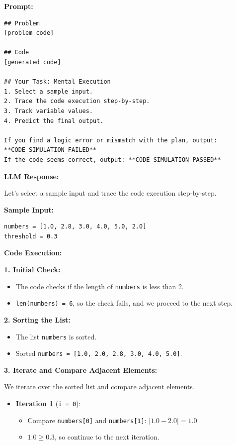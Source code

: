 \documentclass[11pt]{article}
\begin{document}
\begin{tcolorbox}[breakable, colback=white, colframe=black!70, boxrule=0.5pt, arc=2pt, left=4mm, right=4mm, top=3mm, bottom=3mm]
\textbf{Prompt:}
\begin{verbatim}
## Problem
[problem code]

## Code
[generated code]

## Your Task: Mental Execution
1. Select a sample input.
2. Trace the code execution step-by-step.
3. Track variable values.
4. Predict the final output.

If you find a logic error or mismatch with the plan, output: **CODE_SIMULATION_FAILED**
If the code seems correct, output: **CODE_SIMULATION_PASSED**
\end{verbatim}

\textbf{LLM Response:}

Let's select a sample input and trace the code execution step-by-step.

\textbf{Sample Input:}
\begin{verbatim}
numbers = [1.0, 2.8, 3.0, 4.0, 5.0, 2.0]
threshold = 0.3
\end{verbatim}

\textbf{Code Execution:}

\textbf{1. Initial Check:}
\begin{itemize}
    \item The code checks if the length of \texttt{numbers} is less than 2.
    \item \texttt{len(numbers) = 6}, so the check fails, and we proceed to the next step.
\end{itemize}

\textbf{2. Sorting the List:}
\begin{itemize}
    \item The list \texttt{numbers} is sorted.
    \item Sorted \texttt{numbers = [1.0, 2.0, 2.8, 3.0, 4.0, 5.0]}.
\end{itemize}

\textbf{3. Iterate and Compare Adjacent Elements:}

We iterate over the sorted list and compare adjacent elements.

\begin{itemize}
    \item \textbf{Iteration 1} (\texttt{i = 0}):
    \begin{itemize}
        \item Compare \texttt{numbers[0]} and \texttt{numbers[1]}: $|1.0 - 2.0| = 1.0$
        \item $1.0 \geq 0.3$, so continue to the next iteration.
    \end{itemize}
    

\end{itemize}
\end{tcolorbox}
\end{document}
